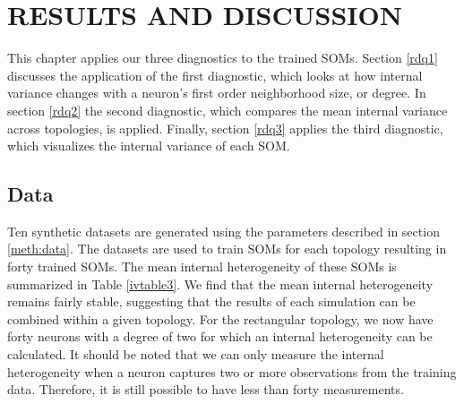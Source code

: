 \chapter{RESULTS AND DISCUSSION}
This chapter applies our three diagnostics to the trained SOMs.  Section
\ref{rdq1} discusses the application of the first diagnostic, which looks at how internal variance
changes with a neuron's first order neighborhood size, or degree.  In section
\ref{rdq2} the second diagnostic, which compares the mean
internal variance across topologies, is applied.  Finally, section \ref{rdq3} applies the
third diagnostic, which visualizes the internal variance of each SOM.

\section{Data}
Ten synthetic datasets are generated using the parameters described in section
\ref{meth:data}.  The datasets are used to train SOMs for each topology
resulting in forty trained SOMs. The mean internal heterogeneity of these SOMs
is summarized in Table \ref{ivtable3}.  We find that the mean internal
heterogeneity remains fairly stable, suggesting that the results of each
simulation can be combined within a given topology.  For the rectangular
topology, we now have forty neurons with a degree of two for which an internal
heterogeneity can be calculated. It should be noted that we can only measure
the internal heterogeneity when a neuron captures two or more observations
from the training data.  Therefore, it is still possible to have less than
forty measurements.

